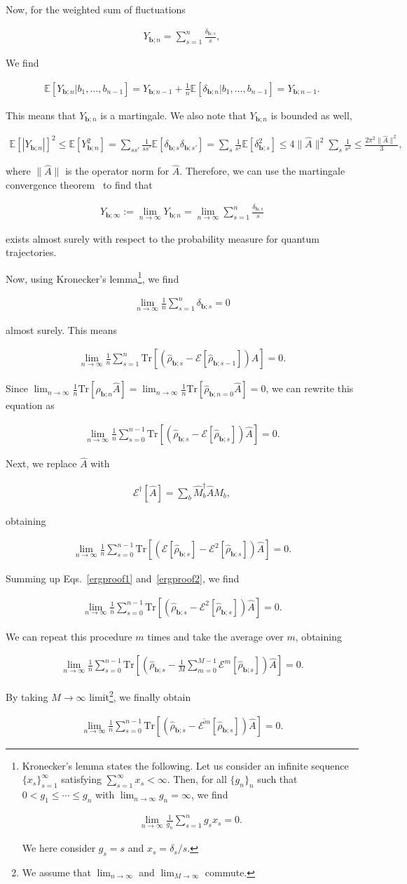 \documentclass[preprint,pteplogo]{ptephy_v2}%
\numberwithin{equation}{section}
\theoremstyle{definition}
\newcommand{\av}[1]{\overline{#1}}
\newcommand{\ml}[1]{\mathcal{#1}}
\newcommand{\mr}[1]{\mathrm{#1}}
\newcommand{\mbb}[1]{\mathbb{#1}}
\newcommand{\lrs}[1]{\left( #1 \right)}
\newcommand{\lrl}[1]{\left[ #1 \right]}
\newcommand{\aln}[1]{
\begin{align}
#1
\end{align}
}
\newcommand{\ra}{\rightarrow}
\newcommand{\Tr}{\mr{Tr}}
\begin{document}
Now, for the weighted sum of fluctuations
\aln{
Y_{\bm{b};n}=\sum_{s=1}^n\frac{\delta_{\bm{b};s}}{s},
}
We find
\aln{
\mbb{E}[Y_{\bm{b};n}|b_1,\ldots,b_{n-1}]=Y_{\bm{b};n-1}+\frac{1}{n}\mbb{E}[\delta_{\bm{b};n}|b_1,\ldots,b_{n-1}]=Y_{\bm{b};n-1}.
}
This means that $Y_{\bm{b};n}$ is a martingale. 
We also note that $Y_{\bm{b};n}$ is bounded as well,
\aln{
\mbb{E}[|Y_{\bm{b};n}|]^2\leq \mbb{E}[Y_{\bm{b};n}^2]
=\sum_{ss'}\frac{1}{ss'}\mbb{E}[\delta_{\bm{b};s}\delta_{\bm{b};s'}]=\sum_s\frac{1}{s^2}
\mbb{E}[\delta_{\bm{b};s}^2]\leq 4\|\hat{A}\|^2\sum_s\frac{1}{s^2}
\leq\frac{2\pi^2\|\hat{A}\|^2}{3},
}
where $\|\hat{A}\|$ is the operator norm for $\hat{A}$.
Therefore, we can use the martingale convergence theorem~\cite{hall2014martingale} to find that
\aln{
Y_{\bm{b};\infty}:=\lim_{n\ra\infty}Y_{\bm{b};n}=\lim_{n\ra\infty}\sum_{s=1}^n\frac{\delta_{\bm{b};s}}{s}
}
exists almost surely with respect to the probability measure for quantum trajectories.

Now, using Kronecker's lemma\footnote{
Kronecker's lemma states the following. Let us consider an infinite sequence $\{x_s\}_{s=1}^\infty$ satisfying $\sum_{s=1}^\infty x_s<\infty$. 
Then, for all $\{g_n\}_n$ such that $0<g_1\leq\cdots\leq g_n$ with $\lim_{n\ra\infty}g_n=\infty$, we find
\aln{
\lim_{n\ra\infty}\frac{1}{g_n}\sum_{s=1}^ng_sx_s=0.
} 
We here consider $g_s=s$ and $x_s=\delta_s/s$.
}, we find
\aln{
\lim_{n\ra\infty}\frac{1}{n}\sum_{s=1}^{n}\delta_{\bm{b};s}=0
}
almost surely.
This means
\aln{
\lim_{n\ra\infty}\frac{1}{n}\sum_{s=1}^n\Tr\lrl{\lrs{\hat{\rho}_{\bm{b};s}-\ml{E}[\hat{\rho}_{\bm{b};s-1}]}\hat{A}}=0.
}
Since $\lim_{n\ra\infty}\frac{1}{n}\Tr[\hat{\rho}_{\bm{b};n}\hat{A}]=\lim_{n\ra\infty}\frac{1}{n}\Tr[\hat{\rho}_{\bm{b};n=0}\hat{A}]=0$, we can rewrite this equation as
\aln{\label{ergproof1}
\lim_{n\ra\infty}\frac{1}{n}\sum_{s=0}^{n-1}\Tr\lrl{\lrs{\hat{\rho}_{\bm{b};s}-\ml{E}[\hat{\rho}_{\bm{b};s}]}\hat{A}}=0.
}

Next, we replace $\hat{A}$ with 
\aln{
\ml{E}^\dag[\hat{A}]=\sum_b\hat{M}_b^\dag\hat{A}\hat{M}_b,
}
obtaining
\aln{\label{ergproof2}
\lim_{n\ra\infty}\frac{1}{n}\sum_{s=0}^{n-1}\Tr\lrl{\lrs{\ml{E}[\hat{\rho}_{\bm{b};s}]-\ml{E}^2[\hat{\rho}_{\bm{b};s}]}\hat{A}}=0.
}
Summing up Eqs.~\eqref{ergproof1} and~\eqref{ergproof2}, we find
\aln{
\lim_{n\ra\infty}\frac{1}{n}\sum_{s=0}^{n-1}\Tr\lrl{\lrs{\hat{\rho}_{\bm{b};s}-\ml{E}^2[\hat{\rho}_{\bm{b};s}]}\hat{A}}=0.
}
We can repeat this procedure $m$ times and take the average over $m$, obtaining
\aln{
\lim_{n\ra\infty}\frac{1}{n}\sum_{s=0}^{n-1}\Tr\lrl{\lrs{\hat{\rho}_{\bm{b};s}-\frac{1}{M}\sum_{m=0}^{M-1}\ml{E}^m[\hat{\rho}_{\bm{b};s}]}\hat{A}}=0.
}
By taking $M\ra\infty$ limit\footnote{
We assume that $\lim_{n\ra\infty}$ and $\lim_{M\ra\infty}$ commute.
}, we finally obtain
\aln{\label{ergproof3}
\lim_{n\ra\infty}\frac{1}{n}\sum_{s=0}^{n-1}\Tr\lrl{\lrs{\hat{\rho}_{\bm{b};s}-\av{\ml{E}^m}[\hat{\rho}_{\bm{b};s}]}\hat{A}}=0.
}
\end{document}

